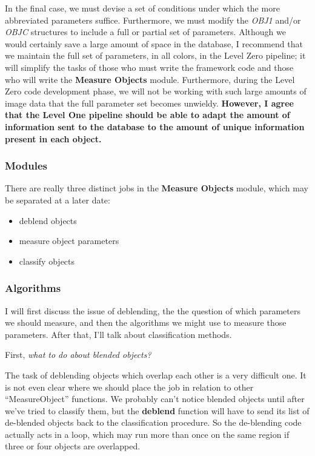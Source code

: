 In the final case, we must devise a set of conditions under which
the more abbreviated parameters suffice.  Furthermore, we must 
modify the {\it OBJ1} and/or {\it OBJC} structures to include
a full or partial set of parameters.
Although we would certainly save a large amount of space in the
database, I recommend that we maintain the full set of parameters,
in all colors, in the Level Zero pipeline; it will simplify the 
tasks of those who must write the framework code and those who
will write the {\bf Measure Objects} module.
Furthermore, during the Level Zero code development phase,
we will not be working with such large amounts of image data that
the full parameter set becomes unwieldy.  
{\bf However, I agree that the Level One pipeline should be able
to adapt the amount of information sent to the database to the
amount of unique information present in each object.}

\subsubsection {Modules}

  There are really three distinct jobs in the {\bf Measure Objects}
module, which may be separated at a later date:

\begin {itemize}
   \item deblend objects
   \item measure object parameters
   \item classify objects
\end {itemize}

\subsubsection {Algorithms}

  I will first discuss the issue of deblending, 
the the question of which parameters we 
should measure, and then the algorithms we might use to measure
those parameters. After that, I'll talk about classification methods.

\medskip

  First, {\it what to do about blended objects?}

  The task of deblending objects which overlap each other is
a very difficult one.  It is not even clear where we should place
the job in relation to other ``MeasureObject'' functions.
We probably can't notice blended objects until after we've
tried to classify them, but the {\bf deblend} function will
have to send its list of de-blended objects back to the 
classification procedure.  So the de-blending code actually
acts in a loop, which may run more than once on the same 
region if three or four objects are overlapped.

